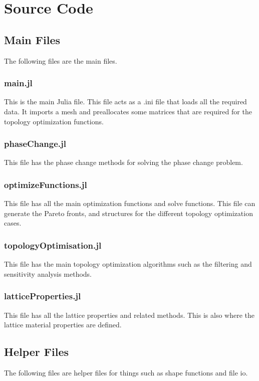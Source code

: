 \chapter{Source Code}

\section*{Main Files}
The following files are the main files.

\subsection*{main.jl}
This is the main Julia file. This file acts as a .ini file that loads all the required data. It imports a mesh and preallocates some matrices that are required for the topology optimization functions.


\subsection*{phaseChange.jl}
This file has the phase change methods for solving the phase change problem.


\subsection*{optimizeFunctions.jl}
This file has all the main optimization functions and solve functions. This file can generate the Pareto fronts, and structures for the different topology optimization cases.


\subsection*{topologyOptimisation.jl}
This file has the main topology optimization algorithms such as the filtering and sensitivity analysis methods.


\subsection*{latticeProperties.jl}
This file has all the lattice properties and related methods. This is also where the lattice material properties are defined.



\section*{Helper Files}
The following files are helper files for things such as shape functions and file io.

